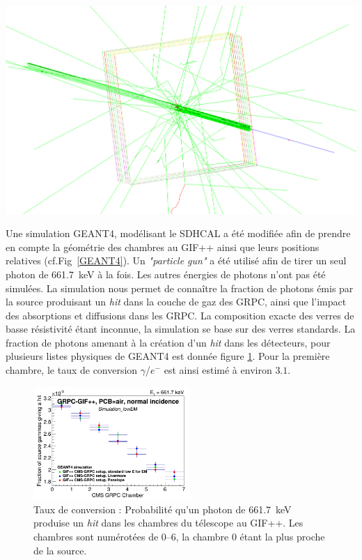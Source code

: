 \marginpar
{
	\centering
	\includegraphics[width=\marginparwidth]{GLA/geant4.png}
	\label{GEANT4}
}

Une simulation GEANT4, modélisant le SDHCAL a été modifiée afin de prendre en compte la géométrie des chambres au GIF++ ainsi que leurs positions relatives (cf.Fig~\ref{GEANT4}). Un \textit{"particle gun"} a été utilisé afin de tirer un seul photon de \SI{661.7}{\kilo\eV} à la fois. Les autres énergies de photons n'ont pas été simulées. La simulation nous permet de connaître la fraction de photons émis par la source produisant un \textit{hit} dans la couche de gaz des GRPC, ainsi que l'impact des absorptions et diffusions dans les GRPC. La composition exacte des verres de basse résistivité étant inconnue, la simulation se base sur des verres standards. La fraction de photons amenant à la création d'un \textit{hit} dans les détecteurs, pour plusieurs listes physiques de GEANT4 est donnée figure \ref{conversion}. Pour la première chambre, le taux de conversion $\gamma$/$e^{-}$ est ainsi estimé à environ $\num{3.1}$\textperthousand.

\begin{figure}[!ht]
	\centering
	\includegraphics[width=0.53\textwidth]{GLA/taux.png}
	\caption{Taux de conversion : Probabilité qu'un photon de \SI{661.7}{\kilo\eV} produise un \textit{hit} dans les chambres du télescope au GIF++. Les chambres sont numérotées de \SIrange{0}{6}{}, la chambre \num{0} étant la plus proche de la source.}
	\label{conversion}
\end{figure}

